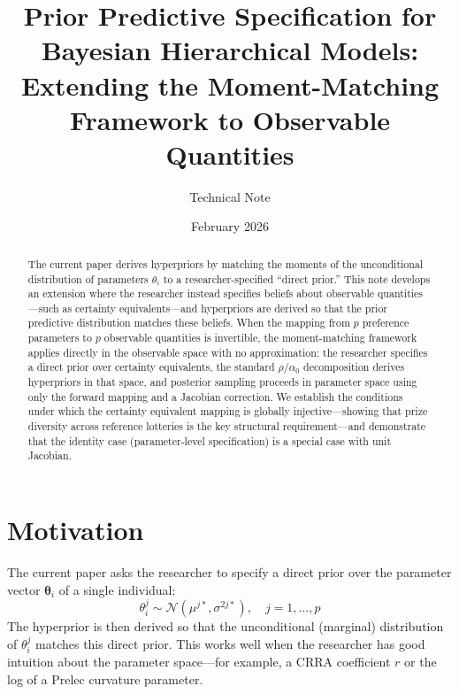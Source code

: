 \documentclass[11pt,a4paper]{article}
\title{Prior Predictive Specification for\\Bayesian Hierarchical Models:\\
Extending the Moment-Matching Framework to Observable Quantities}
\author{Technical Note}
\date{February 2026}
\theoremstyle{definition}
\newcommand{\Normal}{\mathcal{N}}
\newcommand{\btheta}{\boldsymbol{\theta}}
\begin{document}
\maketitle

\begin{abstract}
The current paper derives hyperpriors by matching the moments of the
unconditional distribution of parameters $\theta_i$ to a researcher-specified
``direct prior.'' This note develops an extension where the researcher instead
specifies beliefs about observable quantities---such as certainty
equivalents---and hyperpriors are derived so that the prior predictive
distribution matches these beliefs. When the mapping from $p$ preference
parameters to $p$ observable quantities is invertible, the moment-matching
framework applies directly in the observable space with no approximation:
the researcher specifies a direct prior over certainty equivalents, the
standard $\rho/\alpha_0$ decomposition derives hyperpriors in that space, and
posterior sampling proceeds in parameter space using only the forward mapping
and a Jacobian correction. We establish the conditions under which the
certainty equivalent mapping is globally injective---showing that prize
diversity across reference lotteries is the key structural requirement---and
demonstrate that the identity case (parameter-level specification) is a special
case with unit Jacobian.
\end{abstract}

\tableofcontents
\newpage

\section{Motivation}

The current paper asks the researcher to specify a direct prior over the
parameter vector $\btheta_i$ of a single individual:
\begin{equation}
    \theta_i^j \sim \Normal(\mu^{j*}, \sigma^{2j*}), \quad j = 1, \ldots, p
\end{equation}
The hyperprior is then derived so that the unconditional (marginal) distribution
of $\theta_i^j$ matches this direct prior. This works well when the researcher
has good intuition about the parameter space---for example, a CRRA coefficient
$r$ or the log of a Prelec curvature parameter.
\end{document}
